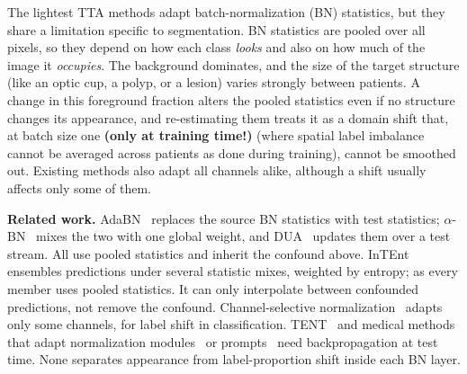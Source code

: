\documentclass{article}
\begin{document}
The lightest TTA methods adapt batch-normalization (BN) statistics, but they share a limitation specific to segmentation. BN statistics are pooled over all pixels, so they depend on how each class \emph{looks} and also on how much of the image it \emph{occupies}. The background dominates, and the size of the target structure (like an optic cup, a polyp, or a lesion) varies strongly between patients. A change in this foreground fraction alters the pooled statistics even if no structure changes its appearance, and re-estimating them treats it as a domain shift that, at batch size one \textbf{(only at training time!)} (where spatial label imbalance cannot be averaged across patients as done during training), cannot be smoothed out. Existing methods also adapt all channels alike, although a shift usually affects only
some of them.

\textbf{Related work.} AdaBN~\cite{li2018adabn} replaces the source BN statistics with test statistics; $\alpha$-BN~\cite{you2021alphabn} mixes the two with one global weight, and DUA~\cite{mirza2022dua} updates them over a test stream. All use pooled statistics and inherit the confound above. InTEnt~\cite{dong2024intent} ensembles predictions under several statistic mixes, weighted by entropy; as every member uses pooled statistics. It can only interpolate between confounded predictions, not remove the confound. Channel-selective normalization~\cite{vianna2024csn} adapts only some channels, for label shift in classification. TENT~\cite{wang2021tent} and medical methods that adapt normalization modules~\cite{karani2021tta} or prompts~\cite{chen2024vptta} need backpropagation at test time. None separates
appearance from label-proportion shift inside each BN layer.
\end{document}

